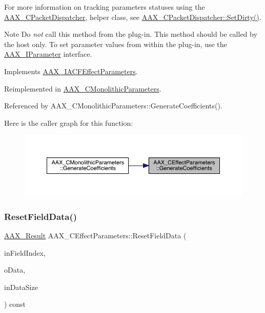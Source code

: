 For more information on tracking parameters\textquotesingle{} statuses using the \mbox{\hyperlink{a01529}{A\+A\+X\+\_\+\+C\+Packet\+Dispatcher}}, helper class, see \mbox{\hyperlink{a01529_a6d4254a842eeee46a227ec761619efb5}{A\+A\+X\+\_\+\+C\+Packet\+Dispatcher\+::\+Set\+Dirty()}}.

\begin{DoxyNote}{Note}
Do {\itshape not} call this method from the plug-\/in. This method should be called by the host only. To set parameter values from within the plug-\/in, use the \mbox{\hyperlink{a01857}{A\+A\+X\+\_\+\+I\+Parameter}} interface. 
\end{DoxyNote}


Implements \mbox{\hyperlink{a01669_a083265b008921b6114ede387711694b7}{A\+A\+X\+\_\+\+I\+A\+C\+F\+Effect\+Parameters}}.



Reimplemented in \mbox{\hyperlink{a01969_a626cb2aaa68c64238298acfd6db448f5}{A\+A\+X\+\_\+\+C\+Monolithic\+Parameters}}.



Referenced by A\+A\+X\+\_\+\+C\+Monolithic\+Parameters\+::\+Generate\+Coefficients().

Here is the caller graph for this function\+:
\nopagebreak
\begin{figure}[H]
\begin{center}
\leavevmode
\includegraphics[width=350pt]{a01481_a2ae4c7e4ed12f2763934da50aa5730f3_icgraph}
\end{center}
\end{figure}
\mbox{\label{a01481_a0dd675680a657de7f9d45d65d4b3bcfb}} 
\subsubsection{\texorpdfstring{ResetFieldData()}{ResetFieldData()}}
{\footnotesize\ttfamily \mbox{\hyperlink{a00392_a4d8f69a697df7f70c3a8e9b8ee130d2f}{A\+A\+X\+\_\+\+Result}} A\+A\+X\+\_\+\+C\+Effect\+Parameters\+::\+Reset\+Field\+Data (\begin{DoxyParamCaption}\item[{\mbox{\hyperlink{a00392_ae807f8986143820cfb5d6da32165c9c7}{A\+A\+X\+\_\+\+C\+Field\+Index}}}]{in\+Field\+Index,  }\item[{void $\ast$}]{o\+Data,  }\item[{uint32\+\_\+t}]{in\+Data\+Size }\end{DoxyParamCaption}) const\hspace{0.3cm}{\ttfamily [virtual]}}



